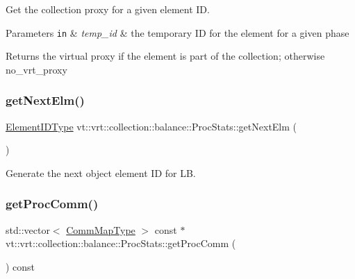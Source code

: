 Get the collection proxy for a given element ID. 


\begin{DoxyParams}[1]{Parameters}
\mbox{\tt in}  & {\em temp\+\_\+id} & the temporary ID for the element for a given phase\\
\hline
\end{DoxyParams}
\begin{DoxyReturn}{Returns}
the virtual proxy if the element is part of the collection; otherwise {\ttfamily no\+\_\+vrt\+\_\+proxy} 
\end{DoxyReturn}
\mbox{\label{structvt_1_1vrt_1_1collection_1_1balance_1_1_proc_stats_aff0ecd6f0016ebd074b982caad107806}} 
\subsubsection{\texorpdfstring{get\+Next\+Elm()}{getNextElm()}}
{\footnotesize\ttfamily \hyperlink{namespacevt_1_1vrt_1_1collection_1_1balance_a14c8d2c972f2913aa3f1636e5be0a120}{Element\+I\+D\+Type} vt\+::vrt\+::collection\+::balance\+::\+Proc\+Stats\+::get\+Next\+Elm (\begin{DoxyParamCaption}{ }\end{DoxyParamCaption})}



Generate the next object element ID for LB. 

\mbox{\label{structvt_1_1vrt_1_1collection_1_1balance_1_1_proc_stats_ab8fb4abaaf87156825e60cf43b74ca34}} 
\subsubsection{\texorpdfstring{get\+Proc\+Comm()}{getProcComm()}}
{\footnotesize\ttfamily std\+::vector$<$ \hyperlink{namespacevt_1_1vrt_1_1collection_1_1balance_a10860c956804d644db54a16012352728}{Comm\+Map\+Type} $>$ const  $\ast$ vt\+::vrt\+::collection\+::balance\+::\+Proc\+Stats\+::get\+Proc\+Comm (\begin{DoxyParamCaption}{ }\end{DoxyParamCaption}) const}



